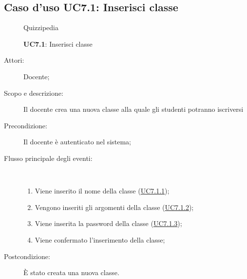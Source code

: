 \subsection{Caso d'uso UC7.1: Inserisci classe}
	\begin{figure}[H]
		\centering
		\begin{resizedtikzpicture}{\textwidth}
		\begin{umlsystem}[x=0, fill=lightgray!20]{Quizzipedia}
		\end{umlsystem}
		\end{resizedtikzpicture}
		\caption{\textbf{UC7.1}: Inserisci classe}
		\label{UC7.1}
	\end{figure}
\begin{description}
\item[Attori:] Docente;
\item[Scopo e descrizione:] Il docente crea una nuova classe alla quale gli studenti potranno iscriversi 
      \item[Precondizione:] Il docente è autenticato nel sistema;

        \item[Flusso principale degli eventi:] \ 
 \begin{enumerate}
          \item Viene inserito il nome della classe (\hyperlink{UC7.1.1}{UC7.1.1});
          \item Vengono inseriti gli argomenti della classe (\hyperlink{UC7.1.2}{UC7.1.2});
          \item Viene inserita la password della classe (\hyperlink{UC7.1.3}{UC7.1.3});
          \item Viene confermato l'inserimento della classe;

      \end{enumerate}
    \item[Postcondizione:] È stato creata una nuova classe.
  \end{description}
\hypertarget{UC7.1.1}{}

